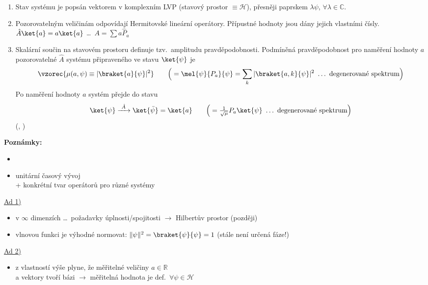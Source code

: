 \documentclass[11pt,a4paper]{article}
\begin{document}
\begin{veta}
\begin{enumerate}[label=\textcircled{\arabic*}]
  \item Stav systému je popsán vektorem v komplexním LVP (stavový prostor $\equiv\mathcal{H}$), přesněji paprskem $\lambda\psi$, $\forall\lambda\in\mathbb{C}$.
  \item Pozorovatelným veličinám odpovídají Hermitovské lineární operátory. Přípustné hodnoty jsou dány jejich vlastními čísly. \hfill $\hat A\ket{a} = a\ket{a}$ \dots\ $A = \sum a\hat P_a$
  \item Skalární součin na stavovém prostoru definuje tzv.\ amplitudu pravděpodobnosti. Podmíněná pravděpodobnost pro naměření hodnoty $a$ pozorovatelné $\hat A$ systému připraveného ve stavu $\ket{\psi}$ je
  \[
    \vzorec{\mu(a,\psi) \equiv |\braket{a}{\psi}|^2} \qquad
    \Big(= \mel{\psi}{P_a}{\psi} = \sum_k |\braket{a,k}{\psi}|^2 \ \dots\ \text{degenerované spektrum}\Big)
  \]
  Po naměření hodnoty $a$ systém přejde do stavu
  \[
    \ket{\psi} \xrightarrow{\ \hat A\ } \ket{\bar\psi} = \ket{a}
    \qquad \Big(= \tfrac{1}{\sqrt{\mu}}P_a\ket{\psi}\ \dots\ \text{degenerované spektrum}\Big)
  \]
  (, ) 
\end{enumerate}
\end{veta}

\textbf{Poznámky:}
\begin{itemize}[nosep]
  \item[--] 
  \item[--]  unitární časový vývoj \\
             + konkrétní tvar operátorů pro různé systémy
\end{itemize}

\underline{Ad 1)}
\begin{itemize}[nosep]
  \item[--] v $\infty$ dimenzích \dots\ požadavky úplnosti/spojitosti $\to$ Hilbertův prostor (později)
  \item[--] vlnovou funkci je výhodné normovat: $\|\psi\|^2 = \braket{\psi}{\psi} = 1$ \quad (stále není určená fáze!)
\end{itemize}

\underline{Ad 2)}
\begin{itemize}[nosep]
  \item[--] z vlastností výše plyne, že měřitelné veličiny $a\in\mathbb{R}$ \\
            a vektory tvoří bázi $\to$ měřitelná hodnota je def.\ $\forall\psi\in\mathcal{H}$
\end{itemize}
\end{document}
